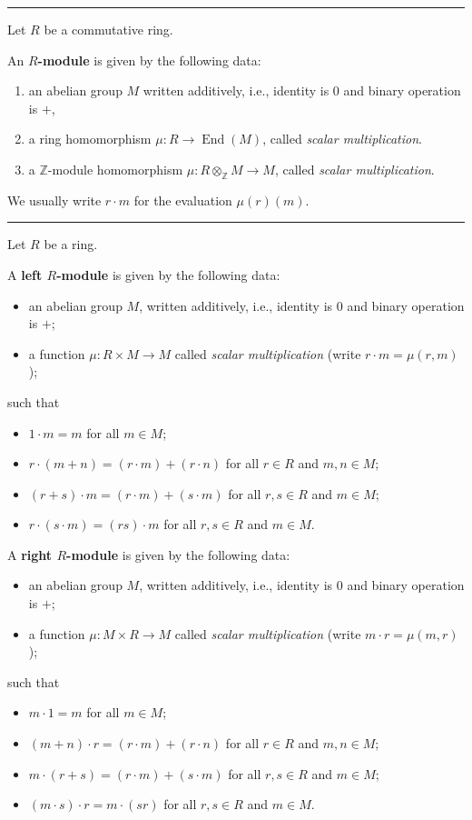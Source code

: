 \documentclass[12pt]{article}
\newcommand{\keyword}[1]{\textbf{#1}}
\newcommand{\sepline}{\rule{\textwidth}{0.4pt}}
\theoremstyle{definition}
\newcommand{\Z}{\mathbb{Z}}
\newcommand{\<}{\left\langle}
\renewcommand{\>}{\right\rangle}
\newcommand{\tensor}{\otimes}
\DeclareMathOperator{\End}{End}
\begin{document}
\sepline

Let $R$ be a commutative ring.

An \keyword{$R$-module} is given by the following data:
\begin{enumerate}[(1)]
    \item an abelian group $M$ written additively, i.e., identity is $0$ and binary operation is $+$,
    \item a ring homomorphism $\mu : R \to \End(M)$, called \emph{scalar multiplication}.
    \item a $\Z$-module homomorphism $\mu : R \tensor_\Z M \to M$, called \emph{scalar multiplication}.
\end{enumerate}
We usually write $r \cdot m$ for the evaluation $\mu(r)(m)$.

\sepline

Let $R$ be a ring.

A \keyword{left $R$-module} is given by the following data:
\begin{itemize}
    \item an abelian group $M$, written additively, i.e., identity is $0$ and binary operation is $+$;
    \item a function $\mu : R \times M \to M$ called \emph{scalar multiplication} (write $r \cdot m = \mu(r, m)$);
\end{itemize}
such that
\begin{itemize}
    \item $1 \cdot m = m$ for all $m \in M$;
    \item $r \cdot (m + n) = (r \cdot m) + (r \cdot n)$ for all $r \in R$ and $m, n \in M$;
    \item $(r + s) \cdot m = (r \cdot m) + (s \cdot m)$ for all $r, s \in R$ and $m \in M$;
    \item $r \cdot (s \cdot m) = (rs) \cdot m$ for all $r, s \in R$ and $m \in M$.
\end{itemize}

A \keyword{right $R$-module} is given by the following data:
\begin{itemize}
    \item an abelian group $M$, written additively, i.e., identity is $0$ and binary operation is $+$;
    \item a function $\mu : M \times R \to M$ called \emph{scalar multiplication} (write $m \cdot r = \mu(m, r)$);
\end{itemize}
such that
\begin{itemize}
    \item $m \cdot 1 = m$ for all $m \in M$;
    \item $(m + n) \cdot r = (r \cdot m) + (r \cdot n)$ for all $r \in R$ and $m, n \in M$;
    \item $m \cdot (r + s) = (r \cdot m) + (s \cdot m)$ for all $r, s \in R$ and $m \in M$;
    \item $(m \cdot s) \cdot r = m \cdot (sr)$ for all $r, s \in R$ and $m \in M$.
\end{itemize}
\end{document}
